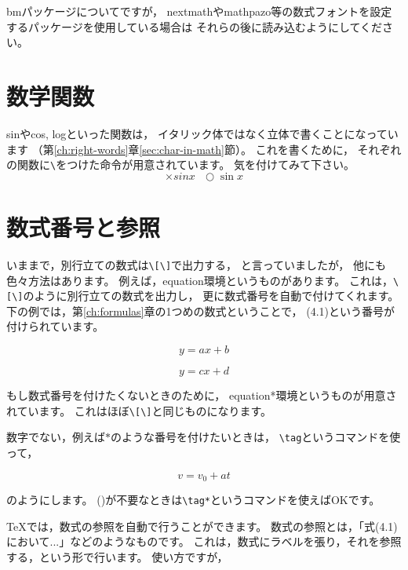 bmパッケージについてですが，
nextmathやmathpazo等の数式フォントを設定するパッケージを使用している場合は
それらの後に読み込むようにしてください。



\section{数学関数}
sinやcos, logといった関数は，
イタリック体ではなく立体で書くことになっています
（第\ref{ch:right-words}章\ref{sec:char-in-math}節）。
これを書くために，
それぞれの関数に\verb|\|をつけた命令が用意されています。
気を付けてみて下さい。
\[ \times sin x \ \ \ \bigcirc \sin x \]



\section{数式番号と参照}
いままで，別行立ての数式は\verb|\[\]|で出力する，
と言っていましたが，
他にも色々方法はあります。
例えば，equation環境というものがあります。
これは，\verb|\[\]|のように別行立ての数式を出力し，
更に数式番号を自動で付けてくれます。
下の例では，第\ref{ch:formulas}章の1つめの数式ということで，
(4.1)という番号が付けられています。

\begin{IOTeX}
\begin{equation}
y = ax + b
\end{equation}

\begin{equation*}
y = cx + d
\end{equation*}
\end{IOTeX}

もし数式番号を付けたくないときのために，
equation*環境というものが用意されています。
これはほぼ\verb|\[\]|と同じものになります。

数字でない，例えば$*$のような番号を付けたいときは，
\verb|\tag|というコマンドを使って，
\begin{IOTeX}
\begin{equation*}
v = v_0 + at \tag{$*$}
\end{equation*}
\end{IOTeX}
のようにします。
()が不要なときは\verb|\tag*|というコマンドを使えばOKです。


{\TeX}では，数式の参照を自動で行うことができます。
数式の参照とは，「式(4.1)において...」などのようなものです。
これは，数式にラベルを張り，それを参照する，という形で行います。
使い方ですが，

